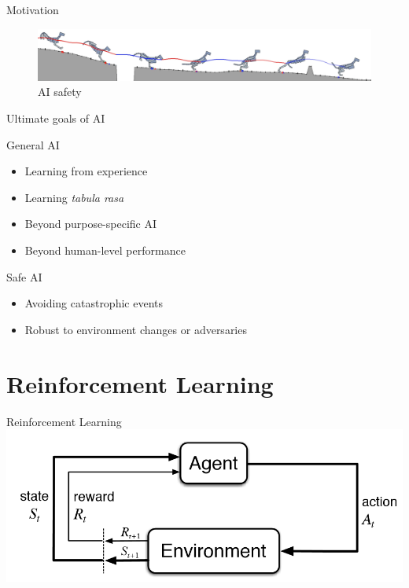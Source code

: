 \documentclass{beamer}
\begin{document}
\begin{frame}{Motivation}
\begin{figure}
\includegraphics[width=\linewidth]{../gfx/running_tiger.png}
\caption{AI safety}
\end{figure}
\end{frame}


\begin{frame}{Ultimate goals of AI}

\begin{block}{General AI}
\begin{itemize}
\item Learning from experience
\item Learning \textit{tabula rasa}
\item Beyond purpose-specific AI
\item Beyond human-level performance
\end{itemize}
\end{block}

\begin{block}{Safe AI}
\begin{itemize}
\item Avoiding catastrophic events
\item Robust to environment changes or adversaries
\end{itemize}
\end{block}

\end{frame}




\section{Reinforcement Learning}

\begin{frame}{Reinforcement Learning}
\includegraphics[width=\linewidth]{../gfx/rl_cycle.png}
\end{frame}
\end{document}
